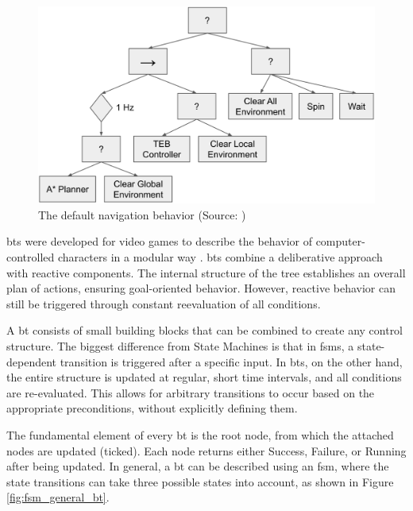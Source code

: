 \begin{figure}[h]
    \centering
    \includegraphics[width=\textwidth]{figures/20_state_of_the_art/nav2_bt.png}
    \caption[The default navigation behavior]{The default navigation behavior (Source: \cite{macenski_marathon_2020})}
    \label{fig:nav2_bt}
\end{figure}

\Glspl{bt} were developed for video games to describe the behavior of computer-controlled characters in a modular way \cite{hutchison_evolving_2010}. \Glspl{bt} combine a deliberative approach with reactive components. The internal structure of the tree establishes an overall plan of actions, ensuring goal-oriented behavior. However, reactive behavior can still be triggered through constant reevaluation of all conditions. 

A \gls{bt} consists of small building blocks that can be combined to create any control structure. The biggest difference from State Machines is that in \glspl{fsm}, a state-dependent transition is triggered after a specific input. In \glspl{bt}, on the other hand, the entire structure is updated at regular, short time intervals, and all conditions are re-evaluated. This allows for arbitrary transitions to occur based on the appropriate preconditions, without explicitly defining them.

The fundamental element of every \gls{bt} is the root node, from which the attached nodes are updated (ticked). Each node returns either Success, Failure, or Running after being updated. In general, a \gls{bt} can be described using an \gls{fsm}, where the state transitions can take three possible states into account, as shown in Figure \ref{fig:fsm_general_bt}.

